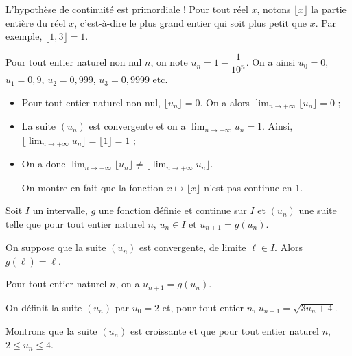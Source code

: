 \documentclass[11pt,fleqn, openany]{book} %
\begin{document}
L'hypothèse de continuité est primordiale !
Pour tout réel $x$, notons $\lfloor x \rfloor$ la partie entière du réel $x$, c'est-à-dire le plus grand entier qui soit plus petit que $x$. Par exemple, $\lfloor 1,3 \rfloor = 1$.

Pour tout entier naturel non nul $n$, on note $u_n=1-\dfrac{1}{10^n}$. On a ainsi $u_0=0$, $u_1=0,9$, $u_2=0,999$, $u_3=0,9999$ etc.

\begin{itemize}
\item Pour tout entier naturel non nul, $\lfloor u_n \rfloor = 0$. On a alors $\displaystyle\lim_{n\to +\infty} \lfloor u_n \rfloor = 0$ ;
\item La suite $(u_n)$ est convergente et on a $\displaystyle\lim_{n\to +\infty} u_n = 1$. Ainsi, $\lfloor \displaystyle\lim_{n\to +\infty} u_n \rfloor=\lfloor 1 \rfloor=1$ ;
\item On a donc  $\displaystyle\lim_{n\to +\infty} \lfloor u_n \rfloor \neq \lfloor \displaystyle\lim_{n\to +\infty} u_n \rfloor$. 

On montre en fait que la fonction $x\mapsto  \lfloor x \rfloor$ n'est pas continue en 1.
\end{itemize}

\newpage

\begin{theorem}Soit $I$ un intervalle, $g$ une fonction définie et continue sur $I$ et $(u_n)$ une suite telle que pour tout entier naturel $n$, $u_n \in I$ et $u_{n+1}=g(u_n)$.

On suppose que la suite $(u_n)$ est convergente, de limite $\ell\in I$. Alors $g(\ell)=\ell$.\end{theorem}

\begin{demonstration} Pour tout entier naturel $n$, on a $u_{n+1}=g(u_n)$.

\vskip50pt

\end{demonstration}

\begin{example}On définit la suite $(u_n)$ par $u_0=2$ et, pour tout entier $n$, $u_{n+1}=\sqrt{3u_n+4}$.

Montrons que la suite $(u_n)$ est croissante et que pour tout entier naturel $n$, $2 \leqslant u_n \leqslant 4$.

\vskip320pt


\end{example}
\end{document}

